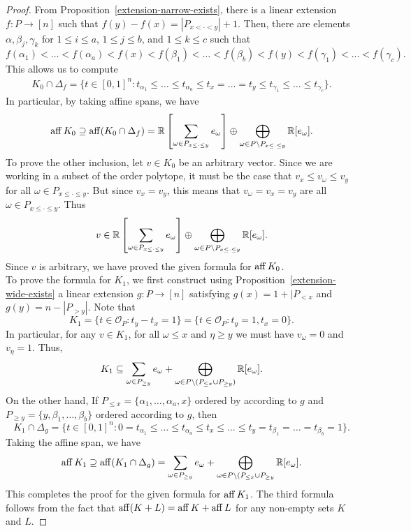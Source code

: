 \documentclass{puthesis-UG}
\begin{document}
\begin{proof}
    From Proposition~\ref{extension-narrow-exists}, there is a linear extension $f : P \to [n]$ such that $f(y) - f(x) = |P_{x < \cdot < y}| + 1$. Then, there are elements $\alpha, \beta_j, \gamma_k$ for $1 \leq i \leq a$, $1 \leq j \leq b$, and $1 \leq k \leq c$ such that 
    \[
        f(\alpha_1) < \ldots < f(\alpha_a) < f(x) < f(\beta_1) < \ldots < f(\beta_b) < f(y) < f(\gamma_1) < \ldots < f(\gamma_c).
     \] 
    This allows us to compute 
    \begin{align*}
        K_0 \cap \Delta_f = \{t \in [0, 1]^n : t_{\alpha_1} \leq \ldots \leq t_{\alpha_a} \leq t_x = \ldots = t_y \leq t_{\gamma_1} \leq \ldots \leq t_{\gamma_c} \}.
    \end{align*}
    In particular, by taking affine spans, we have 
    \[
        \operatorname{aff} K_0 \supseteq \operatorname{aff} (K_0 \cap \Delta_f) = \mathbb{R} \left [\sum_{\omega \in P_{x \leq \cdot \leq y}} e_\omega \right ] \oplus \bigoplus_{\omega \in P \backslash P_{x \leq \cdot \leq y}} \mathbb{R}[e_\omega].
    \]
    To prove the other inclusion, let $v \in K_0$ be an arbitrary vector. Since we are working in a subset of the order polytope, it must be the case that $v_x \leq v_\omega \leq v_y$ for all $\omega \in P_{x \leq \cdot \leq y}$. But since $v_x = v_y$, this means that $v_{\omega} = v_x = v_y$ are all $\omega \in P_{x \leq \cdot \leq y}$. Thus
    \[
        v \in \mathbb{R} \left [ \sum_{\omega \in P_{x \leq \cdot \leq y}} e_\omega \right ] \oplus \bigoplus_{\omega \in P \backslash P_{x \leq \cdot \leq y}} \mathbb{R}[e_\omega].
    \]
    Since $v$ is arbitrary, we have proved the given formula for $\operatorname{aff} K_0$. \\

    To prove the formula for $K_1$, we first construct using Proposition~\ref{extension-wide-exists} a linear extension $g : P \to [n]$ satisfying $g(x) = 1 + |P_{< x}$ and $g(y) = n - |P_{> y}|$. Note that 
    \[
        K_1 = \{t \in \mathcal{O}_P : t_y - t_x = 1 \} = \{t \in \mathcal{O}_P : t_y = 1, t_x = 0\}.
    \]
    In particular, for any $v \in K_1$, for all $\omega \leq x$ and $\eta \geq y$ we must have $v_\omega = 0$ and $v_\eta = 1$. Thus, 
    \[
        K_1 \subseteq \sum_{\omega \in P_{ \geq y}} e_\omega + \bigoplus_{\omega \in P \backslash (P_{\leq x} \cup P_{\geq y})} \mathbb{R}[e_\omega].
    \]
    On the other hand, If $P_{\leq x} = \{\alpha_1, \ldots, \alpha_a, x\}$ ordered by according to $g$ and $P_{\geq y} = \{y, \beta_1, \ldots, \beta_b\}$ ordered according to $g$, then
    \[
        K_1 \cap \Delta_g = \{t \in [0, 1]^n : 0 = t_{\alpha_1} \leq \ldots \leq t_{\alpha_a} \leq t_x \leq \ldots \leq t_y = t_{\beta_1} = \ldots = t_{\beta_b} = 1 \}.
    \]
    Taking the affine span, we have 
    \[
        \operatorname{aff} K_1 \supseteq \operatorname{aff} (K_1 \cap \Delta_g) = \sum_{\omega \in P_{\geq y}} e_{\omega} + \bigoplus_{\omega \in P \backslash (P_{\leq x} \cup P_{\geq y}} \mathbb{R}[e_\omega]. 
    \]
    This completes the proof for the given formula for $\operatorname{aff} K_1$. The third formula follows from the fact that $\operatorname{aff} (K+L) = \operatorname{aff} K + \operatorname{aff} L$ for any non-empty sets $K$ and $L$. 
\end{proof}
\end{document}
